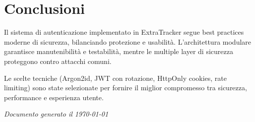 \documentclass[11pt,a4paper]{article}
\begin{document}
\section{Conclusioni}

Il sistema di autenticazione implementato in ExtraTracker segue best practices moderne di sicurezza, bilanciando protezione e usabilità. L'architettura modulare garantisce manutenibilità e testabilità, mentre le multiple layer di sicurezza proteggono contro attacchi comuni.

Le scelte tecniche (Argon2id, JWT con rotazione, HttpOnly cookies, rate limiting) sono state selezionate per fornire il miglior compromesso tra sicurezza, performance e esperienza utente.

\vspace{1cm}

\textit{Documento generato il \today}
\end{document}
